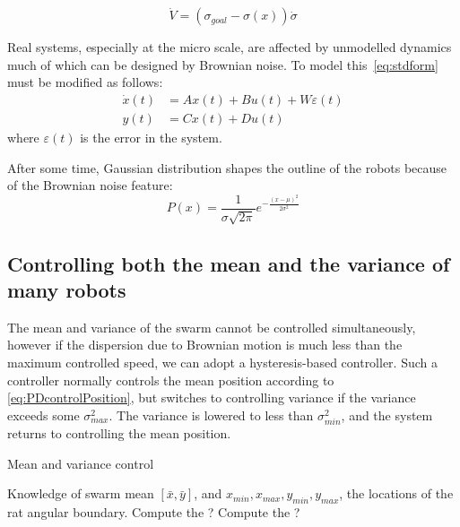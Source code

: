 

\begin{equation}
\dot{V} = (\sigma_{goal} - \sigma(x)) \dot{\sigma}
\end{equation}





Real systems, especially at the micro scale, are affected by unmodelled dynamics much of which can be designed by Brownian noise. To model this~\eqref{eq:stdform} must be modified as follows:
\begin{align}
\dot{x}(t)  &=  A x(t) + B u(t) + W \varepsilon(t)\\
y(t) &= C x(t) + D u(t)\nonumber
\end{align}
where $\varepsilon(t)$ is the error in the system.

After some time, Gaussian distribution shapes the outline of the robots because of the Brownian noise feature:\\
\begin{equation}
P(x) = \frac{1}{\sigma \sqrt{2\pi } }e^{ -  \frac{\left( x - \mu  \right)^2 } {2\sigma ^2 }}
\end{equation}

\subsection{Controlling both the mean and the variance of many robots}

The mean and variance of the swarm cannot be controlled simultaneously, however if the dispersion due to Brownian motion is much less than the maximum controlled speed, we can adopt a hysteresis-based controller.  Such a controller normally controls the mean position according to \eqref{eq:PDcontrolPosition}, but switches to controlling variance if the variance exceeds some $\sigma_{max}^2$.  The variance is lowered to less than $\sigma_{min}^2$, and the system returns to controlling the mean position.

\begin{algorithm}
\caption{Mean and variance control}\label{alg:MeanVarianceControl}
\begin{algorithmic}[1]
\Require Knowledge of swarm mean $[\bar{x},\bar{y}]$, and $x_{min}, x_{max}, y_{min}, y_{max}$, the locations of the rat angular boundary.
\Loop
\State  Compute the ?
\State Compute the ?
\EndLoop
\end{algorithmic}
\end{algorithm}



